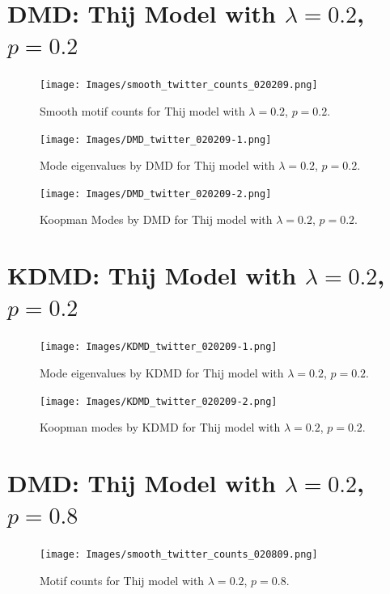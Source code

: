 \clearpage

\section{DMD: Thij Model with $\lambda=0.2$, $p=0.2$}
\begin{figure}
    \texttt{[image: Images/smooth\_twitter\_counts\_020209.png]}
    \centering
    \caption{Smooth motif counts for Thij model
    with $\lambda=0.2$, $p=0.2$.}
    \label{fig:pthij0202}
\end{figure}

\clearpage

\begin{figure}
    \texttt{[image: Images/DMD\_twitter\_020209-1.png]}
    \centering
    \caption{Mode eigenvalues by DMD for Thij model
    with $\lambda=0.2$, $p=0.2$.}
\end{figure}

\begin{figure}
    \texttt{[image: Images/DMD\_twitter\_020209-2.png]}
    \centering
    \caption{Koopman Modes by DMD for Thij model
    with $\lambda=0.2$, $p=0.2$.}
\end{figure}

\clearpage

\section{KDMD: Thij Model with $\lambda=0.2$, $p=0.2$}

\FloatBarrier


\begin{figure}
    \texttt{[image: Images/KDMD\_twitter\_020209-1.png]}
    \centering
    \caption{Mode eigenvalues by KDMD for Thij model
    with $\lambda=0.2$, $p=0.2$.}
\end{figure}

\begin{figure}
    \texttt{[image: Images/KDMD\_twitter\_020209-2.png]}
    \centering
    \caption{Koopman modes by KDMD for Thij model
    with $\lambda=0.2$, $p=0.2$.}
\end{figure}

\clearpage
\FloatBarrier
\section{DMD: Thij Model with $\lambda=0.2$, $p=0.8$}
\begin{figure}
    \texttt{[image: Images/smooth\_twitter\_counts\_020809.png]}
    \centering
    \caption{Motif counts for Thij model with $\lambda=0.2$, $p=0.8$.}
    \label{fig:pthij0208}
\end{figure}

